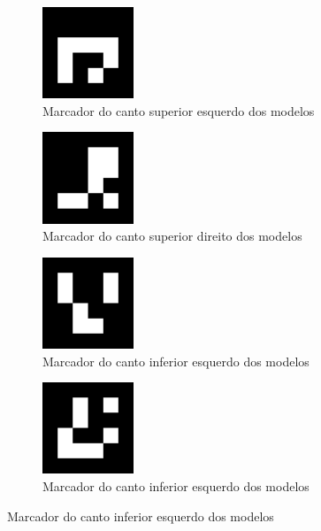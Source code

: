 \documentclass[12pt]{report}
\begin{document}
{\begin{figure}[H]
  \centering
  \begin{subfigure}{0.4\textwidth}
    \centering
    \includegraphics[width=0.3\textwidth]{imagens/4x4_1000-1.png}
    \caption{Marcador do canto superior esquerdo dos modelos}
    \label{fig:TOPLEFT}
  \end{subfigure}
  \begin{subfigure}{0.4\textwidth}
    \centering
    \includegraphics[width=0.3\textwidth]{imagens/4x4_1000-2.png}
    \caption{Marcador do canto superior direito dos modelos}
    \label{fig:TOPRIGHT}
  \end{subfigure}
  \begin{subfigure}{0.4\textwidth}
    \centering
    \includegraphics[width=0.3\textwidth]{imagens/4x4_1000-3.png}
    \caption{Marcador do canto inferior esquerdo dos modelos}
    \label{fig:BOTTOMLEFT}
  \end{subfigure}
  \begin{subfigure}{0.4\textwidth}
    \centering
    \includegraphics[width=0.3\textwidth]{imagens/4x4_1000-4.png}
    \caption{Marcador do canto inferior esquerdo dos modelos}
    \label{fig:BOTTOMRIGHT}
  \end{subfigure}
\end{figure}

}
\end{document}
